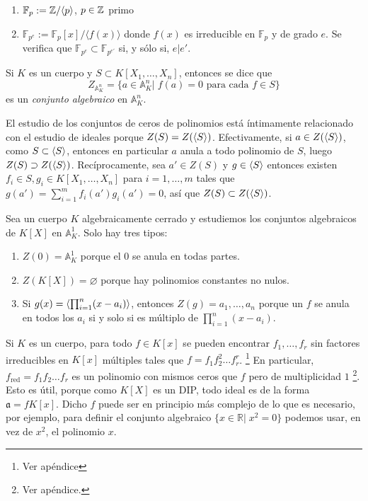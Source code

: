 \documentclass[./main.tex]{subfiles}
\begin{document}
\begin{example}
\begin{enumerate}
  \item $\mathbb{F}_p:=\mathbb{Z}/\langle p\rangle$, $p\in\mathbb{Z}$ primo
  \item $\mathbb{F}_{p^e}:=\mathbb{F}_p[x]/\langle f(x)\rangle$ donde $f(x)$ es irreducible en $\mathbb{F}_p$ y de grado $e$. Se verifica que $\mathbb{F}_{p^{e}}\subset\mathbb{F}_{p^{e'}}$ si, y sólo si, $e|e'$.
\end{enumerate}
\end{example}

\begin{definition}
Si $K$ es un cuerpo y $S\subset K[X_1, \dots, X_n]$, entonces se dice que
\[Z_{\mathbb A^n_K} = \{a \in \mathbb A^n_K \big \vert \; f(a) = 0 \text{ para cada } f\in S \} \]
es un \emph{conjunto algebraico} en $\mathbb A^n_K$.
\end{definition}

El estudio de los conjuntos de ceros de polinomios está íntimamente relacionado con el estudio de ideales porque $Z ( S) = Z ( \langle S \rangle )$. Efectivamente, si $a\in Z(\langle S \rangle)$, como $S \subset \langle S \rangle$, entonces en particular $a$ anula a todo polinomio de $S$, luego $Z ( S) \supset Z ( \langle S \rangle )$. Recíprocamente, sea $a'\in Z(S)$ y $g \in \langle S \rangle$ entonces existen $f_i\in S, g_i \in K[X_1,\dots, X_n]$ para $i = 1,\dots, m$ tales que $g(a') = \sum_{i=1}^m f_i(a')g_i(a') = 0$, así que $Z ( S) \subset Z ( \langle S \rangle )$.

\begin{example}
Sea un cuerpo $K$ algebraicamente cerrado y estudiemos los conjuntos algebraicos de $K[X]$ en $\mathbb A^1_K$. Solo hay tres tipos:
\begin{enumerate}
    \item $ Z(0) = \mathbb A^1_K$ porque el $0$ se anula en todas partes.
    \item $Z(K[X]) = \varnothing$ porque hay polinomios constantes no nulos.
    \item Si $g(x) = \langle \prod_{i=1}^n (x - a_i) \rangle$, entonces $ Z(g) = {a_1,\dots, a_n}$ porque un $f$ se anula en todos los $a_i$ si y solo si es múltiplo de $\prod_{i=1}^n (x-a_i)$.
\end{enumerate}
\end{example}

Si $K$ es un cuerpo, para todo $f\in K[x]$ se pueden encontrar $f_1,\dots, f_r$ sin factores irreducibles en $K[x]$ múltiples tales que $f = f_1 f_2^2 \dots f_r^r$. \footnote{Ver apéndice} En particular, $f_{\operatorname{red}} = f_1f_2 \dots f_r$ es un polinomio con mismos ceros que $f$ pero de multiplicidad $1$ \footnote{Ver apéndice.}. Esto es útil, porque como $K[X]$ es un DIP, todo ideal es de la forma $\mathfrak a = f K[x] $. Dicho $f$ puede ser en principio más complejo de lo que es necesario, por ejemplo, para definir el conjunto algebraico $\{x \in \mathbb R \vert \; x^2 = 0 \}$ podemos usar, en vez de $x^2$, el polinomio $x$.
\end{document}

